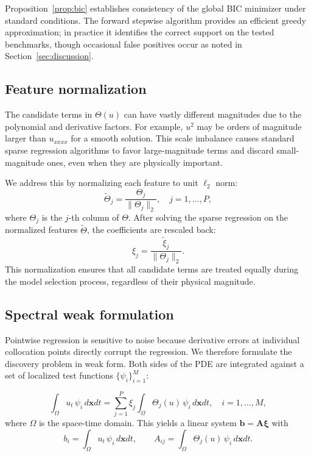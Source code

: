 \documentclass[preprint,12pt]{elsarticle}
\begin{document}
Proposition~\ref{prop:bic} establishes consistency of the global BIC minimizer under standard conditions. The forward stepwise algorithm provides an efficient greedy approximation; in practice it identifies the correct support on the tested benchmarks, though occasional false positives occur as noted in Section~\ref{sec:discussion}.

\subsection{Feature normalization}
\label{sec:norm}

The candidate terms in $\Theta(u)$ can have vastly different magnitudes due to the polynomial and derivative factors. For example, $u^2$ may be orders of magnitude larger than $u_{xxxx}$ for a smooth solution. This scale imbalance causes standard sparse regression algorithms to favor large-magnitude terms and discard small-magnitude ones, even when they are physically important.

We address this by normalizing each feature to unit $\ell_2$ norm:
\begin{equation}
\tilde{\Theta}_j = \frac{\Theta_j}{\|\Theta_j\|_2}, \quad j = 1, \ldots, P,
\end{equation}
where $\Theta_j$ is the $j$-th column of $\Theta$. After solving the sparse regression on the normalized features $\tilde{\Theta}$, the coefficients are rescaled back:
\begin{equation}
\xi_j = \frac{\tilde{\xi}_j}{\|\Theta_j\|_2}.
\end{equation}
This normalization ensures that all candidate terms are treated equally during the model selection process, regardless of their physical magnitude.

\subsection{Spectral weak formulation}
\label{sec:weak}

Pointwise regression is sensitive to noise because derivative errors at individual collocation points directly corrupt the regression. We therefore formulate the discovery problem in weak form. Both sides of the PDE are integrated against a set of localized test functions $\{\psi_i\}_{i=1}^{M}$:

\begin{equation}
\int_\Omega u_t \, \psi_i \, d\mathbf{x} dt = \sum_{j=1}^{P} \xi_j \int_\Omega \Theta_j(u) \, \psi_i \, d\mathbf{x} dt, \quad i = 1, \ldots, M,
\end{equation}
where $\Omega$ is the space-time domain. This yields a linear system $\mathbf{b} = \mathbf{A} \boldsymbol{\xi}$ with
\begin{equation}
b_i = \int_\Omega u_t \, \psi_i \, d\mathbf{x} dt, \qquad A_{ij} = \int_\Omega \Theta_j(u) \, \psi_i \, d\mathbf{x} dt.
\end{equation}
\end{document}
